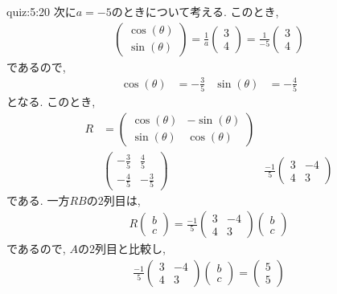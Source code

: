 \begin{answerof}{quiz:5:20}
 次に$a=-5$のときについて考える.
 このとき,
 \begin{align*}
    \begin{pmatrix}\cos(\theta)\\\sin(\theta)\end{pmatrix}
    =\frac{1}{a}\begin{pmatrix}3\\4\end{pmatrix}    
    =\frac{1}{-5}\begin{pmatrix}3\\4\end{pmatrix}    
  \end{align*}
 であるので,
 \begin{align*}
   \cos(\theta)&=-\frac{3}{5}&
   \sin(\theta)&=-\frac{4}{5}
 \end{align*}
 となる.
 このとき, 
 \begin{align*}
   R&=\begin{pmatrix}\cos(\theta)&-\sin(\theta)\\\sin(\theta)&\cos(\theta)\end{pmatrix}\\
   &\begin{pmatrix}-\frac{3}{5}&\frac{4}{5}\\-\frac{4}{5}&-\frac{3}{5}\end{pmatrix}
   &\frac{-1}{5}\begin{pmatrix}3&-4\\4&3\end{pmatrix}
 \end{align*}
 である.
 一方$RB$の2列目は,
 \begin{align*}
   R\begin{pmatrix}b\\c\end{pmatrix}
   =\frac{-1}{5}\begin{pmatrix}3&-4\\4&3\end{pmatrix}\begin{pmatrix}b\\c\end{pmatrix}
\end{align*}
 であるので, $A$の2列目と比較し,
 \begin{align*}
\frac{-1}{5}\begin{pmatrix}3&-4\\4&3\end{pmatrix}\begin{pmatrix}b\\c\end{pmatrix}=\begin{pmatrix}5\\5\end{pmatrix}

\end{align*}
\end{answerof}
